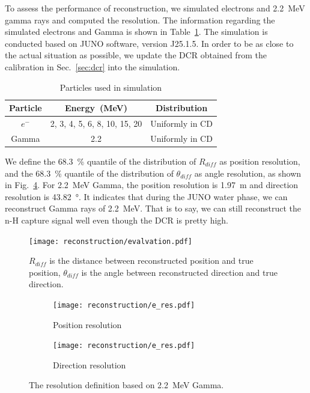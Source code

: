 To assess the performance of reconstruction, we simulated electrons and \SI{2.2}{MeV} gamma rays and computed the resolution. The information regarding the simulated electrons and Gamma is shown in Table~\ref{tab:particles}. The simulation is conducted based on JUNO software, version J25.1.5. In order to be as close to the actual situation as possible, we update the DCR obtained from the calibration in Sec.~\ref{sec:dcr} into the simulation.
\begin{table}[ht]
	\centering
	\caption{Particles used in simulation}
	\label{tab:particles}
	\begin{tabular}{ccc}
		\toprule
		Particle & Energy~(MeV)                 & Distribution    \\
		\midrule
		$e^-$    & 2, 3, 4, 5, 6, 8, 10, 15, 20 & Uniformly in CD \\
		Gamma    & 2.2                          & Uniformly in CD \\
		\bottomrule
	\end{tabular}
\end{table}

We define the \SI{68.3}{\%} quantile of the distribution of $R_{diff}$ as position resolution, and
the \SI{68.3}{\%} quantile of the distribution of $\theta_{diff}$ as angle resolution, as shown in Fig.~\ref{fig:dir_cal}. For \SI{2.2}{MeV} Gamma, the position resolution is \SI{1.97}{m} and direction resolution is \SI{43.82}{\degree}. It indicates that during the JUNO water phase, we can reconstruct Gamma rays of \SI{2.2}{MeV}. That is to say, we can still reconstruct the n-H capture signal well even though the DCR is pretty high.
\begin{figure}[h]
	\centering
	\texttt{[image: reconstruction/evalvation.pdf]}
	\caption{$R_{diff}$ is the distance between reconstructed position and true position, $\theta_{diff}$ is the angle between reconstructed direction and true direction.}
	\label{fig:evalvation}
\end{figure}

\begin{figure}[h]
	\centering
	\begin{subfigure}{0.5\textwidth} %
		\centering
		\texttt{[image: reconstruction/e\_res.pdf]}
		\caption{Position resolution}
		\label{fig:gamma_pos}
	\end{subfigure}%
	\hfill
	\begin{subfigure}{0.5\textwidth}
		\centering
		\texttt{[image: reconstruction/e\_res.pdf]}
		\caption{Direction resolution}
		\label{fig:gamma_dir}
	\end{subfigure}%
	\caption{The resolution definition based on \SI{2.2}{MeV} Gamma.}
	\label{fig:dir_cal}
\end{figure}

